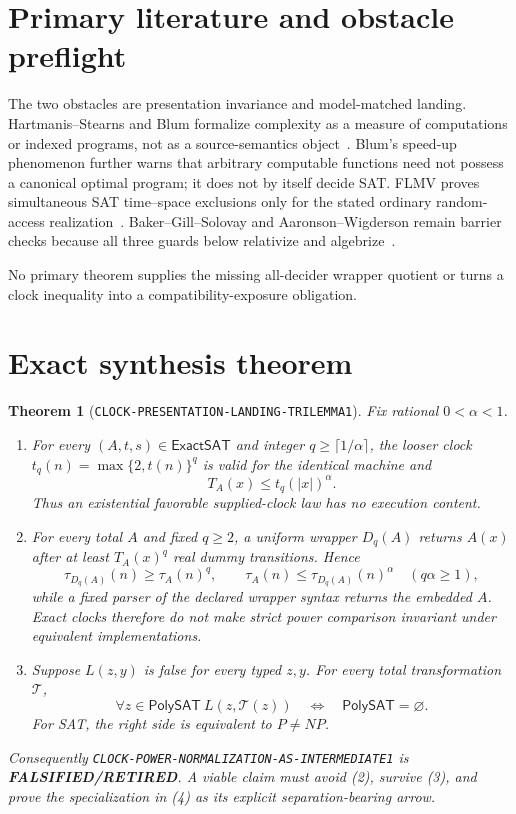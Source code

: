 \documentclass[11pt]{article}
\newtheorem{theorem}{Theorem}
\newcommand{\ExactSAT}{\mathsf{ExactSAT}}
\newcommand{\PolySAT}{\mathsf{PolySAT}}
\newcommand{\RETIRED}{\textbf{FALSIFIED/RETIRED}}
\begin{document}
\section{Primary literature and obstacle preflight}

The two obstacles are presentation invariance and model-matched landing.
Hartmanis--Stearns and Blum formalize complexity as a measure of computations
or indexed programs, not as a source-semantics object~\cite{HS65,Blum67}.
Blum's speed-up phenomenon further warns that arbitrary computable functions
need not possess a canonical optimal program; it does not by itself decide
SAT.  FLMV proves simultaneous SAT time--space exclusions only for the stated
ordinary random-access realization~\cite{FLMV05}.  Baker--Gill--Solovay and
Aaronson--Wigderson remain barrier checks because all three guards below
relativize and algebrize~\cite{BGS75,AW09}.

No primary theorem supplies the missing all-decider wrapper quotient or turns
a clock inequality into a compatibility-exposure obligation.

\section{Exact synthesis theorem}

\begin{theorem}[\texttt{CLOCK-PRESENTATION-LANDING-TRILEMMA1}]
Fix rational $0<\alpha<1$.
\begin{enumerate}[label=(\roman*),leftmargin=1.7em]
\item For every $(A,t,s)\in\ExactSAT$ and integer
$q\ge\lceil1/\alpha\rceil$, the looser clock
$t_q(n)=\max\{2,t(n)\}^q$ is valid for the identical machine and
\[
                    T_A(x)\le t_q(|x|)^\alpha.                \tag{2}
\]
Thus an existential favorable supplied-clock law has no execution content.
\item For every total $A$ and fixed $q\ge2$, a uniform wrapper $D_q(A)$
returns $A(x)$ after at least $T_A(x)^q$ real dummy transitions.  Hence
\[
 \tau_{D_q(A)}(n)\ge\tau_A(n)^q,
 \qquad \tau_A(n)\le\tau_{D_q(A)}(n)^\alpha
 \quad(q\alpha\ge1),                                       \tag{3}
\]
while a fixed parser of the declared wrapper syntax returns the embedded
$A$.  Exact clocks therefore do not make strict power comparison invariant
under equivalent implementations.
\item Suppose $L(z,y)$ is false for every typed $z,y$.  For every total
transformation $\mathcal T$,
\[
 \forall z\in\PolySAT\ L(z,\mathcal T(z))
 \quad\Longleftrightarrow\quad \PolySAT=\varnothing.         \tag{4}
\]
For SAT, the right side is equivalent to $P\ne NP$.
\end{enumerate}
Consequently \texttt{CLOCK-POWER-NORMALIZATION-AS-INTERMEDIATE1} is
\RETIRED.  A viable claim must avoid (2), survive (3), and prove the
specialization in (4) as its explicit separation-bearing arrow.
\end{theorem}
\end{document}
